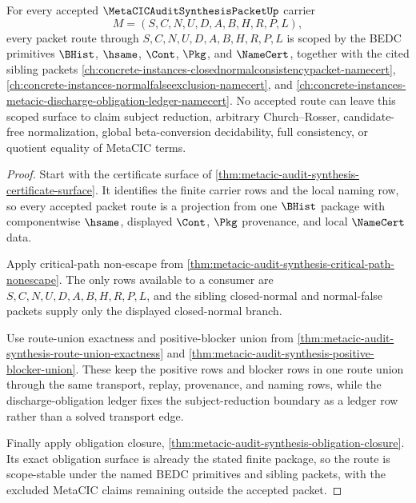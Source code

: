 \begin{theorem}
\label{thm:metacic-audit-synthesis-scope-stability}
For every accepted $\MetaCICAuditSynthesisPacketUp$ carrier
$$
M=(S,C,N,U,D,A,B,H,R,P,L),
$$
every packet route through $S,C,N,U,D,A,B,H,R,P,L$ is scoped by the BEDC primitives $\BHist$, $\hsame$, $\Cont$, $\Pkg$, and $\NameCert$, together with the cited sibling packets \autoref{ch:concrete-instances-closednormalconsistencypacket-namecert}, \autoref{ch:concrete-instances-normalfalseexclusion-namecert}, and \autoref{ch:concrete-instances-metacic-discharge-obligation-ledger-namecert}. No accepted route can leave this scoped surface to claim subject reduction, arbitrary Church--Rosser, candidate-free normalization, global beta-conversion decidability, full consistency, or quotient equality of MetaCIC terms.
\end{theorem}
\begin{proof}
Start with the certificate surface of \autoref{thm:metacic-audit-synthesis-certificate-surface}. It identifies the finite carrier rows and the local naming row, so every accepted packet route is a projection from one $\BHist$ package with componentwise $\hsame$, displayed $\Cont$, $\Pkg$ provenance, and local $\NameCert$ data.

Apply critical-path non-escape from \autoref{thm:metacic-audit-synthesis-critical-path-nonescape}. The only rows available to a consumer are $S,C,N,U,D,A,B,H,R,P,L$, and the sibling closed-normal and normal-false packets supply only the displayed closed-normal branch.

Use route-union exactness and positive-blocker union from \autoref{thm:metacic-audit-synthesis-route-union-exactness} and \autoref{thm:metacic-audit-synthesis-positive-blocker-union}. These keep the positive rows and blocker rows in one route union through the same transport, replay, provenance, and naming rows, while the discharge-obligation ledger fixes the subject-reduction boundary as a ledger row rather than a solved transport edge.

Finally apply obligation closure, \autoref{thm:metacic-audit-synthesis-obligation-closure}. Its exact obligation surface is already the stated finite package, so the route is scope-stable under the named BEDC primitives and sibling packets, with the excluded MetaCIC claims remaining outside the accepted packet.
\end{proof}

